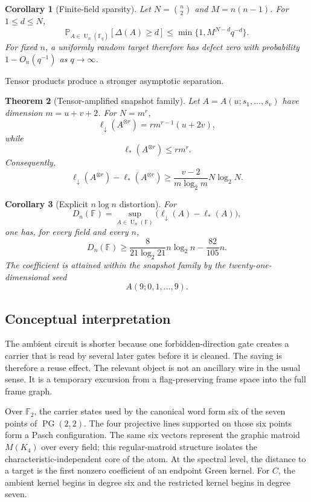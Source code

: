 \documentclass[11pt]{amsart}
\numberwithin{equation}{section}
\newtheorem{theorem}{Theorem}[section]
\newtheorem{corollary}[theorem]{Corollary}
\theoremstyle{definition}
\theoremstyle{remark}
\newcommand{\F}{\mathbb F}
\newcommand{\U}{\operatorname{U}}
\newcommand{\ellDown}{\ell_{\downarrow}}
\newcommand{\ellAll}{\ell_{*}}
\newcommand{\DeltaDef}{\Delta}
\newcommand{\Prob}{\mathbb P}
\begin{document}
\begin{corollary}[Finite-field sparsity]\label{cor:finite-field-sparsity-intro}
Let $N=\binom n2$ and $M=n(n-1)$.  For $1\le d\le N$,
\[
\Prob_{A\in\U_n(\F_q)}[\DeltaDef(A)\ge d]
\le
\min\{1,M^{N-d}q^{-d}\}.
\]
For fixed $n$, a uniformly random target therefore has defect zero with probability $1-O_n(q^{-1})$ as $q\to\infty$.
\end{corollary}

Tensor products produce a stronger asymptotic separation.

\begin{theorem}[Tensor-amplified snapshot family]\label{thm:tensor-main}
Let $A=A(u;s_1,\ldots,s_v)$ have dimension $m=u+v+2$.  For $N=m^r$,
\[
\ellDown(A^{\otimes r})
=r m^{r-1}(u+2v),
\]
while
\[
\ellAll(A^{\otimes r})
\le r m^r.
\]
Consequently,
\[
\ellDown(A^{\otimes r})-\ellAll(A^{\otimes r})
\ge
\frac{v-2}{m\log_2m}N\log_2N.
\]
\end{theorem}

\begin{corollary}[Explicit $n\log n$ distortion]\label{cor:nlogn-gap}
For
\[
D_n(\F)
=
\sup_{A\in\U_n(\F)}
\bigl(\ellDown(A)-\ellAll(A)\bigr),
\]
one has, for every field and every $n$,
\[
D_n(\F)
\ge
\frac{8}{21\log_2 21}n\log_2n
-
\frac{82}{105}n.
\]
The coefficient is attained within the snapshot family by the twenty-one-dimensional seed
\[
A(9;0,1,\ldots,9).
\]
\end{corollary}

\subsection*{Conceptual interpretation}

The ambient circuit is shorter because one forbidden-direction gate creates a carrier that is read by several later gates before it is cleaned.  The saving is therefore a reuse effect.  The relevant object is not an ancillary wire in the usual sense.  It is a temporary excursion from a flag-preserving frame space into the full frame graph.

Over $\F_2$, the carrier states used by the canonical word form six of the seven points of $\operatorname{PG}(2,2)$.  The four projective lines supported on those six points form a Pasch configuration.  The same six vectors represent the graphic matroid $M(K_4)$ over every field; this regular-matroid structure isolates the characteristic-independent core of the atom.  At the spectral level, the distance to a target is the first nonzero coefficient of an endpoint Green kernel.  For $C$, the ambient kernel begins in degree six and the restricted kernel begins in degree seven.
\end{document}
